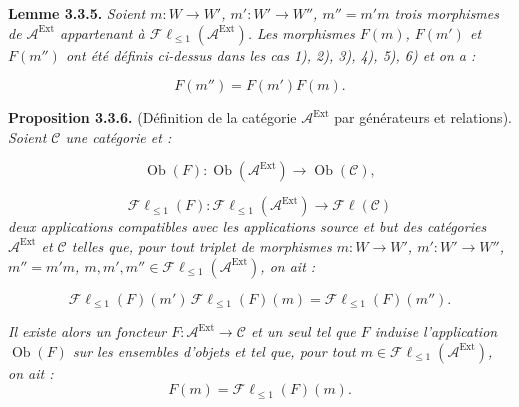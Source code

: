 \clearpage
{}%
\begingroup\small\setlength{\parskip}{0pt}\setlength{\emergencystretch}{1.5em}
\setlength{\abovedisplayskip}{4pt plus 2pt minus 2pt}%
\setlength{\belowdisplayskip}{4pt plus 2pt minus 2pt}%

\medskip\noindent\textbf{Lemme 3.3.5.}\quad
\textit{Soient $m\colon W\longrightarrow W'$, $m'\colon W'\longrightarrow W''$,
$m''=m'm$ trois morphismes de $\mathcal A^{\operatorname{Ext}}$ appartenant
à $\mathcal F\ell_{\leq 1}(\mathcal A^{\operatorname{Ext}})$. Les morphismes
$F(m)$, $F(m')$ et $F(m'')$ ont été définis ci-dessus dans les cas 1), 2),
3), 4), 5), 6) et on a :}

\begin{equation}
F(m'')=F(m')F(m).
\tag{3.3.5.1}
\end{equation}

\medskip\noindent\textbf{Proposition 3.3.6.}\quad
(Définition de la catégorie $\mathcal A^{\operatorname{Ext}}$ par générateurs
et relations). \textit{Soient $\mathcal C$ une catégorie et :}

\[
\operatorname{Ob}(F)\colon
\operatorname{Ob}(\mathcal A^{\operatorname{Ext}})
\longrightarrow \operatorname{Ob}(\mathcal C),
\]

\[
\mathcal F\ell_{\leq 1}(F)\colon
\mathcal F\ell_{\leq 1}(\mathcal A^{\operatorname{Ext}})
\longrightarrow \mathcal F\ell(\mathcal C)
\]
\textit{deux applications compatibles avec les applications source et but
des catégories $\mathcal A^{\operatorname{Ext}}$ et $\mathcal C$ telles que,
pour tout triplet de morphismes $m\colon W\longrightarrow W'$,
$m'\colon W'\longrightarrow W''$, $m''=m'm$,
$m,m',m''\in\mathcal F\ell_{\leq 1}(\mathcal A^{\operatorname{Ext}})$,
on ait :}

\[
\mathcal F\ell_{\leq 1}(F)(m')\,
\mathcal F\ell_{\leq 1}(F)(m)
=\mathcal F\ell_{\leq 1}(F)(m'').
\]

\textit{Il existe alors un foncteur
$F\colon\mathcal A^{\operatorname{Ext}}\longrightarrow\mathcal C$ et un seul
tel que $F$ induise l'application $\operatorname{Ob}(F)$ sur les ensembles
d'objets et tel que, pour tout
$m\in\mathcal F\ell_{\leq 1}(\mathcal A^{\operatorname{Ext}})$, on ait :}
\[
F(m)=\mathcal F\ell_{\leq 1}(F)(m).
\]

